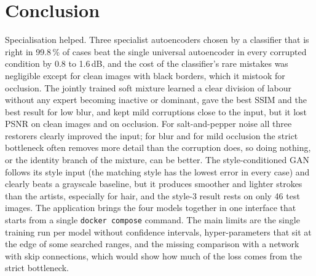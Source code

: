 \documentclass[conference]{IEEEtran}
\begin{document}
\section{Conclusion}
Specialisation helped. Three specialist autoencoders chosen by a classifier that is right in 99.8\,\% of cases beat the single universal autoencoder in every corrupted condition by 0.8 to 1.6\,dB, and the cost of the classifier's rare mistakes was negligible except for clean images with black borders, which it mistook for occlusion. The jointly trained soft mixture learned a clear division of labour without any expert becoming inactive or dominant, gave the best SSIM and the best result for low blur, and kept mild corruptions close to the input, but it lost PSNR on clean images and on occlusion. For salt-and-pepper noise all three restorers clearly improved the input; for blur and for mild occlusion the strict bottleneck often removes more detail than the corruption does, so doing nothing, or the identity branch of the mixture, can be better.
The style-conditioned GAN follows its style input (the matching style has the lowest error in every case) and clearly beats a grayscale baseline, but it produces smoother and lighter strokes than the artists, especially for hair, and the style-3 result rests on only 46 test images.
The application brings the four models together in one interface that starts from a single \texttt{docker compose} command. The main limits are the single training run per model without confidence intervals, hyper-parameters that sit at the edge of some searched ranges, and the missing comparison with a network with skip connections, which would show how much of the loss comes from the strict bottleneck.

\appendices
\end{document}
